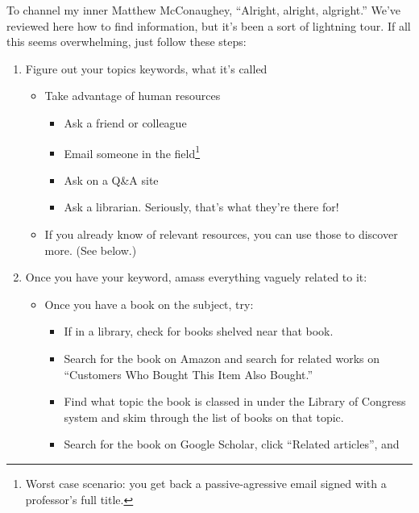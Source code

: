 To channel my inner Matthew McConaughey, ``Alright, alright, algright.'' We've reviewed here how to find information, but it's been a sort of
lightning tour. If all this seems overwhelming, just follow these steps:

\begin{enumerate}
\item Figure out your topics keywords, what it's called
  \begin{itemize}
  \item Take advantage of human resources
    \begin{itemize}
    \item Ask a friend or colleague
    \item Email someone in the field\footnote{Worst case scenario: you get back a
      passive-agressive email signed with a professor's full title.}
    \item Ask on a Q\&A site
    \item Ask a librarian. Seriously, that's what they're there for!
    \end{itemize}
  \item If you already know of relevant resources, you can use those to discover
    more. (See below.)
  \end{itemize}
\item Once you have your keyword, amass everything vaguely related to it:
  \begin{itemize}
    \begin{itemize}
    \item Search for a textbook on the topic.
    \item Search for a review article on the textbook.
    \item Search for an annotated bibliography.
    \item Check the references on Wikipedia for your subject.
    \end{itemize}
  \item Once you have a book on the subject, try:
    \begin{itemize}
    \item If in a library, check for books shelved near that book.
    \item Search for the book on Amazon and search for related works on
      ``Customers Who Bought This Item Also Bought.''
    \item Find what topic the book is classed in under the Library of Congress
      system and skim through the list of books on that topic.
    \item Search for the book on Google Scholar, click ``Related articles'', and

\end{itemize}
\end{itemize}
\end{enumerate}
